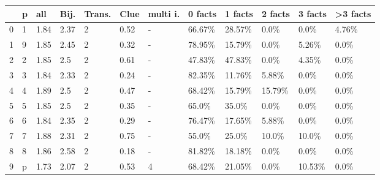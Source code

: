 \begin{tabular}{llllllllllll}
\toprule
{} &  p &   all &  Bij. & Trans. &  Clue & multi i. & 0 facts & 1 facts & 2 facts & 3 facts & >3 facts \\
\midrule
0 &  1 &  1.84 &  2.37 &      2 &  0.52 &        - &  66.67\% &  28.57\% &    0.0\% &    0.0\% &    4.76\% \\
1 &  9 &  1.85 &  2.45 &      2 &  0.32 &        - &  78.95\% &  15.79\% &    0.0\% &   5.26\% &     0.0\% \\
2 &  2 &  1.85 &   2.5 &      2 &  0.61 &        - &  47.83\% &  47.83\% &    0.0\% &   4.35\% &     0.0\% \\
3 &  3 &  1.84 &  2.33 &      2 &  0.24 &        - &  82.35\% &  11.76\% &   5.88\% &    0.0\% &     0.0\% \\
4 &  4 &  1.89 &   2.5 &      2 &  0.47 &        - &  68.42\% &  15.79\% &  15.79\% &    0.0\% &     0.0\% \\
5 &  5 &  1.85 &   2.5 &      2 &  0.35 &        - &   65.0\% &   35.0\% &    0.0\% &    0.0\% &     0.0\% \\
6 &  6 &  1.84 &  2.35 &      2 &  0.29 &        - &  76.47\% &  17.65\% &   5.88\% &    0.0\% &     0.0\% \\
7 &  7 &  1.88 &  2.31 &      2 &  0.75 &        - &   55.0\% &   25.0\% &   10.0\% &   10.0\% &     0.0\% \\
8 &  8 &  1.86 &  2.58 &      2 &  0.18 &        - &  81.82\% &  18.18\% &    0.0\% &    0.0\% &     0.0\% \\
9 &  p &  1.73 &  2.07 &      2 &  0.53 &        4 &  68.42\% &  21.05\% &    0.0\% &  10.53\% &     0.0\% \\
\bottomrule
\end{tabular}
